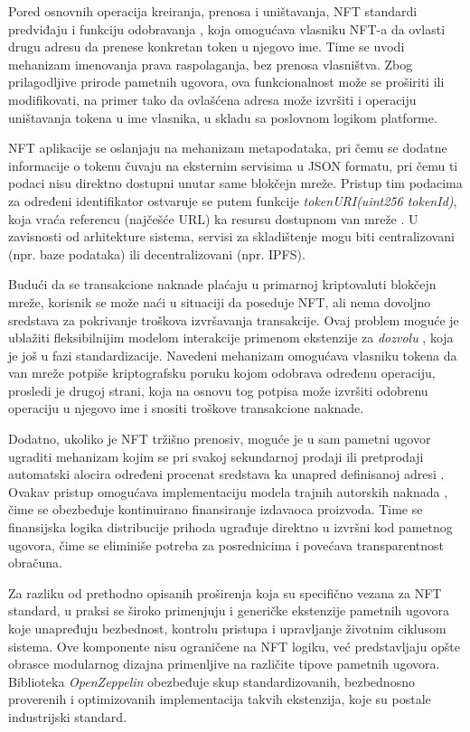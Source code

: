 Pored osnovnih operacija kreiranja, prenosa i uništavanja, NFT standardi predviđaju i funkciju odobravanja , koja omogućava vlasniku NFT-a da ovlasti drugu adresu da prenese konkretan token u njegovo ime. Time se uvodi mehanizam imenovanja prava raspolaganja, bez prenosa vlasništva. Zbog prilagodljive prirode pametnih ugovora, ova funkcionalnost može se proširiti ili modifikovati, na primer tako da ovlašćena adresa može izvršiti i operaciju uništavanja tokena u ime vlasnika, u skladu sa poslovnom logikom platforme.

NFT aplikacije se oslanjaju na mehanizam metapodataka, pri čemu se dodatne informacije o tokenu čuvaju na eksternim servisima u JSON formatu, pri čemu ti podaci nisu direktno dostupni unutar same blokčejn mreže. Pristup tim podacima za određeni identifikator ostvaruje se putem funkcije \textit{tokenURI(uint256 tokenId)}, koja vraća referencu (najčešće URL) ka resursu dostupnom van mreže \cite{salem2025hidden}. U zavisnosti od arhitekture sistema, servisi za skladištenje mogu biti centralizovani (npr. baze podataka) ili decentralizovani (npr. IPFS).

Budući da se transakcione naknade plaćaju u primarnoj kriptovaluti blokčejn mreže, korisnik se može naći u situaciji da poseduje NFT, ali nema dovoljno sredstava za pokrivanje troškova izvršavanja transakcije. Ovaj problem moguće je ublažiti fleksibilnijim modelom interakcije primenom ekstenzije za \textit{dozvolu} \cite{NFTPERMITeip4494} , koja je još u fazi standardizacije. Navedeni mehanizam omogućava vlasniku tokena da van mreže potpiše kriptografsku poruku kojom odobrava određenu operaciju, prosledi je drugoj strani, koja na osnovu tog potpisa može izvršiti odobrenu operaciju u njegovo ime i snositi troškove transakcione naknade.

Dodatno, ukoliko je NFT tržišno prenosiv, moguće je u sam pametni ugovor ugraditi mehanizam kojim se pri svakoj sekundarnoj prodaji ili pretprodaji automatski alocira određeni procenat sredstava ka unapred definisanoj adresi \cite{MARKETeip2981}. Ovakav pristup omogućava implementaciju modela trajnih autorskih naknada , čime se obezbeđuje kontinuirano finansiranje izdavaoca proizvoda. Time se finansijska logika distribucije prihoda ugrađuje direktno u izvršni kod pametnog ugovora, čime se eliminiše potreba za posrednicima i povećava transparentnost obračuna.

Za razliku od prethodno opisanih proširenja koja su specifično vezana za NFT standard, u praksi se široko primenjuju i generičke ekstenzije pametnih ugovora koje unapređuju bezbednost, kontrolu pristupa i upravljanje životnim ciklusom sistema. Ove komponente nisu ograničene na NFT logiku, već predstavljaju opšte obrasce modularnog dizajna primenljive na različite tipove pametnih ugovora. Biblioteka \textit{OpenZeppelin} obezbeđuje skup standardizovanih, bezbednosno proverenih i optimizovanih implementacija takvih ekstenzija, koje su postale industrijski standard.

